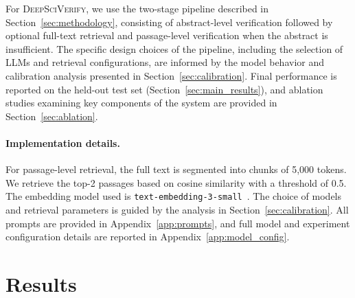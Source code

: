 \documentclass{article}
\theoremstyle{plain}
\theoremstyle{definition}
\theoremstyle{remark}
\begin{document}
For \textsc{DeepSciVerify}, we use the two-stage pipeline described in Section~\ref{sec:methodology}, consisting of abstract-level verification followed by optional full-text retrieval and passage-level verification when the abstract is insufficient. The specific design choices of the pipeline, including the selection of LLMs and retrieval configurations, are informed by the model behavior and calibration analysis presented in Section~\ref{sec:calibration}. Final performance is reported on the held-out test set (Section~\ref{sec:main_results}), and ablation studies examining key components of the system are provided in Section~\ref{sec:ablation}.


\paragraph{Implementation details.}
For passage-level retrieval, the full text is segmented into chunks of 5{,}000 tokens. We retrieve the top-2 passages based on cosine similarity with a threshold of 0.5. The embedding model used is \texttt{text-embedding-3-small}~\cite{openai2024embedding}. The choice of models and retrieval parameters is guided by the analysis in Section~\ref{sec:calibration}. All prompts are provided in Appendix~\ref{app:prompts}, and full model and experiment configuration details are reported in Appendix~\ref{app:model_config}.

\section{Results}
\end{document}
